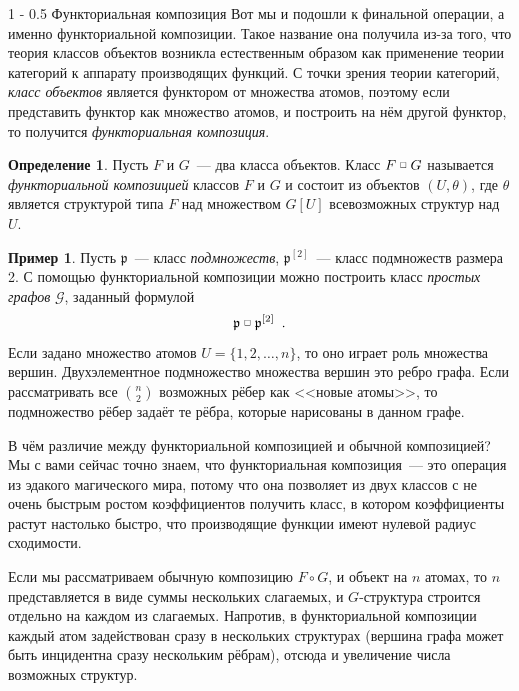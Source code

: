 \documentclass{article}
\makeatletter
\def \fprod {\; \raisebox{.3\height}{\scalebox{0.6}{$\square$}}\; }
\theoremstyle{definition}
\newtheorem{example}{Пример}
\newtheorem*{definition}{Определение}
\renewcommand{\subsection}{\@startsection
{subsection}%
{1}%
{\z@}%
{-\baselineskip}%
{0.5\baselineskip}%
{\centering\large\scshape}} %
\makeatother
\begin{document}
\subsection{Функториальная композиция}
Вот мы и подошли к финальной операции, а именно функториальной композиции. Такое
название она получила из-за того, что теория классов объектов возникла
естественным образом как применение теории категорий к аппарату производящих
функций. С точки зрения теории категорий, \textit{класс объектов} является
функтором от множества атомов, поэтому если представить функтор как множество
атомов, и построить на нём другой функтор, то получится \textit{функториальная
композиция}.

\begin{definition}
    Пусть \( F \) и \( G \)~--- два класса объектов. Класс \( F \fprod G \) 
называется \textit{функториальной композицией} классов \( F \) и \( G \) и
состоит из объектов \( (U, \theta) \), где \( \theta \) является структурой типа
\( F \) над множеством \( G[U] \) всевозможных структур над \( U \).
\end{definition}

\begin{example}
    Пусть \( \mathfrak p \)~--- класс \textit{подмножеств}, \( \mathfrak p^{[2]}
\)~--- класс подмножеств размера 2.
    С помощью функториальной композиции можно построить класс \textit{простых
графов} \( \mathcal G \), заданный формулой
\[
    \mathfrak p \fprod \mathfrak p^{[2]}
    \enspace  .
\]
Если задано множество атомов \( U = \{1, 2, \ldots, n \} \), то оно играет роль
множества вершин. Двухэлементное подмножество множества вершин это ребро графа.
Если рассматривать все \( {n \choose 2} \) возможных рёбер как <<новые атомы>>,
то подмножество рёбер задаёт те рёбра, которые нарисованы в данном графе.
\end{example}

В чём различие между функториальной композицией и обычной композицией? Мы с вами
сейчас точно знаем, что функториальная композиция~--- это операция из эдакого
магического мира, потому что она позволяет из двух классов с не очень быстрым
ростом коэффициентов получить класс, в котором коэффициенты растут настолько
быстро, что производящие функции имеют нулевой радиус сходимости.

Если мы рассматриваем обычную композицию \( F \circ G \), и объект на \( n \)
атомах, то \( n \) представляется в виде суммы нескольких слагаемых, и \( G
\)-структура строится отдельно на каждом из слагаемых. Напротив, в
функториальной композиции каждый атом задействован сразу в нескольких структурах
(вершина графа может быть инцидентна сразу нескольким рёбрам), отсюда и увеличение
числа возможных структур.
\end{document}
